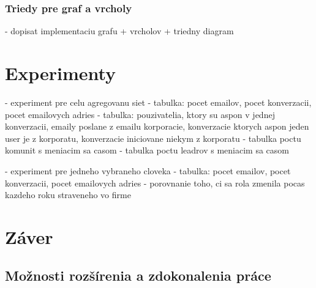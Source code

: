 \documentclass[slovak,master,public,dept460,male,cpdeclaration,oneside]{diploma}
\begin{document}
\subsubsection{Triedy pre graf a vrcholy}
- dopisat implementaciu grafu + vrcholov + triedny diagram

\section{Experimenty}
- experiment pre celu agregovanu siet
- tabulka: pocet emailov, pocet konverzacii, pocet emailovych adries
- tabulka: pouzivatelia, ktory su aspon v jednej konverzacii, emaily poslane z emailu korporacie, konverzacie  ktorych aspon jeden user je z korporatu, konverzacie iniciovane niekym z korporatu
- tabulka poctu komunit s meniacim sa casom
- tabulka poctu leadrov s meniacim sa casom
	
	
- experiment pre jedneho vybraneho cloveka
	- tabulka: pocet emailov, pocet konverzacii, pocet emailovych adries
	- porovnanie toho, ci sa rola zmenila pocas kazdeho roku straveneho vo firme
	
	
\section{Záver}
\subsection{Možnosti rozšírenia a zdokonalenia práce}
\end{document}
